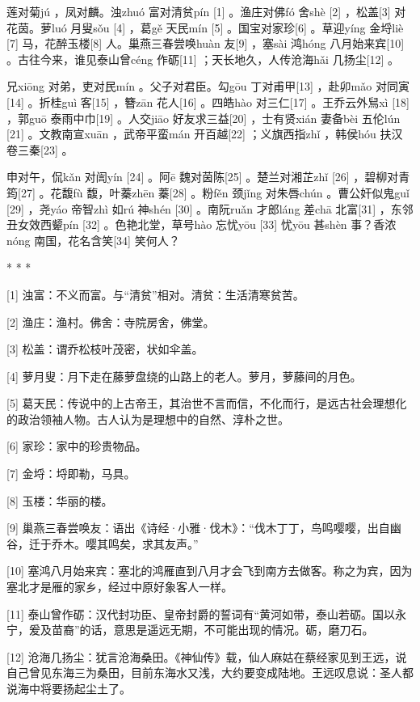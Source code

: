\documentclass[12pt,UTF8]{ctexbook}
\begin{document}
莲对菊jú ，凤对麟。浊zhuó 富对清贫pín [1] 。渔庄对佛fó 舍shè [2] ，松盖[3] 对花茵。萝luó 月叟sǒu [4] ，葛gě 天民mín [5] 。国宝对家珍[6] 。草迎yíng 金埒liè [7] 马，花醉玉楼[8] 人。巢燕三春尝唤huàn 友[9] ，塞sài 鸿hóng 八月始来宾[10] 。古往今来，谁见泰山曾céng 作砺[11] ；天长地久，人传沧海hǎi 几扬尘[12] 。

兄xiōng 对弟，吏对民mín 。父子对君臣。勾gōu 丁对甫甲[13] ，赴卯mǎo 对同寅[14] 。折桂guì 客[15] ，簪zān 花人[16] 。四皓hào 对三仁[17] 。王乔云外舃xì [18] ，郭guō 泰雨中巾[19] 。人交jiāo 好友求三益[20] ，士有贤xián 妻备bèi 五伦lún [21] 。文教南宣xuān ，武帝平蛮mán 开百越[22] ；义旗西指zhǐ ，韩侯hóu 扶汉卷三秦[23] 。

申对午，侃kǎn 对訚yín [24] 。阿ē 魏对茵陈[25] 。楚兰对湘芷zhǐ [26] ，碧柳对青筠[27] 。花馥fù 馥，叶蓁zhēn 蓁[28] 。粉fěn 颈jǐng 对朱唇chún 。曹公奸似鬼guǐ [29] ，尧yáo 帝智zhì 如rú 神shén [30] 。南阮ruǎn 才郎láng 差chā 北富[31] ，东邻丑女效西颦pín [32] 。色艳北堂，草号hào 忘忧yōu [33] 忧yōu 甚shèn 事？香浓nóng 南国，花名含笑[34] 笑何人？



* * *



[1] 浊富：不义而富。与“清贫”相对。清贫：生活清寒贫苦。

[2] 渔庄：渔村。佛舍：寺院房舍，佛堂。

[3] 松盖：谓乔松枝叶茂密，状如伞盖。

[4] 萝月叟：月下走在藤萝盘绕的山路上的老人。萝月，萝藤间的月色。

[5] 葛天民：传说中的上古帝王，其治世不言而信，不化而行，是远古社会理想化的政治领袖人物。古人认为是理想中的自然、淳朴之世。

[6] 家珍：家中的珍贵物品。

[7] 金埒：埒即勒，马具。

[8] 玉楼：华丽的楼。

[9] 巢燕三春尝唤友：语出《诗经·小雅·伐木》：“伐木丁丁，鸟鸣嘤嘤，出自幽谷，迁于乔木。嘤其鸣矣，求其友声。”

[10] 塞鸿八月始来宾：塞北的鸿雁直到八月才会飞到南方去做客。称之为宾，因为塞北才是雁的家乡，经过中原好象客人一样。

[11] 泰山曾作砺：汉代封功臣、皇帝封爵的誓词有“黄河如带，泰山若砺。国以永宁，爰及苗裔”的话，意思是遥远无期，不可能出现的情况。砺，磨刀石。

[12] 沧海几扬尘：犹言沧海桑田。《神仙传》载，仙人麻姑在蔡经家见到王远，说自己曾见东海三为桑田，目前东海水又浅，大约要变成陆地。王远叹息说：圣人都说海中将要扬起尘土了。
\end{document}
